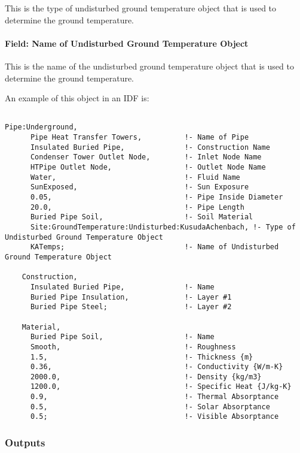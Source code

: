 This is the type of undisturbed ground temperature object that is used to determine the ground temperature.

\paragraph{Field: Name of Undisturbed Ground Temperature Object}\label{field-name-of-undisturbed-ground-temperature-object-001}

This is the name of the undisturbed ground temperature object that is used to determine the ground temperature.

An example of this object in an IDF is:

\begin{lstlisting}

Pipe:Underground,
      Pipe Heat Transfer Towers,          !- Name of Pipe
      Insulated Buried Pipe,              !- Construction Name
      Condenser Tower Outlet Node,        !- Inlet Node Name
      HTPipe Outlet Node,                 !- Outlet Node Name
      Water,                              !- Fluid Name
      SunExposed,                         !- Sun Exposure
      0.05,                               !- Pipe Inside Diameter    
      20.0,                               !- Pipe Length
      Buried Pipe Soil,                   !- Soil Material
      Site:GroundTemperature:Undisturbed:KusudaAchenbach, !- Type of Undisturbed Ground Temperature Object
      KATemps;                            !- Name of Undisturbed Ground Temperature Object

    Construction,
      Insulated Buried Pipe,              !- Name
      Buried Pipe Insulation,             !- Layer #1
      Buried Pipe Steel;                  !- Layer #2

    Material,
      Buried Pipe Soil,                   !- Name
      Smooth,                             !- Roughness
      1.5,                                !- Thickness {m}
      0.36,                               !- Conductivity {W/m-K}
      2000.0,                             !- Density {kg/m3}
      1200.0,                             !- Specific Heat {J/kg-K}
      0.9,                                !- Thermal Absorptance
      0.5,                                !- Solar Absorptance
      0.5;                                !- Visible Absorptance
\end{lstlisting}

\subsubsection{Outputs}\label{outputs-8-004}

